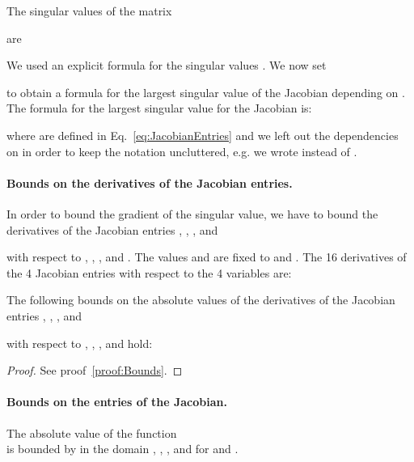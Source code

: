 \documentclass{article}
\begin{document}
The singular values of the  matrix

are

We used an explicit formula for the singular values \citep{Blinn:96}. We now set 

to obtain a formula for the largest singular value of the Jacobian
depending on .
The formula for the largest singular value for the Jacobian is: 



where  are defined in Eq.~\eqref{eq:JacobianEntries} and we left out the dependencies on 
 in order to keep the notation uncluttered, e.g. we 
wrote  instead of .









\paragraph{Bounds on the derivatives of the Jacobian entries.}

In order to bound the gradient of the singular value, we have to bound
the derivatives of the Jacobian entries 
,
,
, and

with respect to 
, , , and . The values 
 and  are fixed to  and .
The 16 derivatives of the 4 Jacobian entries with respect to the 4
variables are:



\begin{lemma}
\label{lem:Bounds}
The following bounds on the absolute values of the 
derivatives of the Jacobian entries ,
,
, and

with respect to 
, , , and  hold:




\end{lemma}

\begin{proof}
 See proof~\ref{proof:Bounds}.
\end{proof}


\paragraph{Bounds on the entries of the Jacobian.}

\begin{lemma}[Bound on J11]
\label{lem:J11}
The absolute value of the function \\ 
 is bounded by 
 in the domain , , , 
and  for  and .
\end{lemma}
\end{document}
